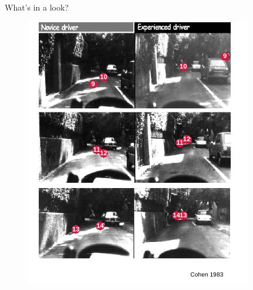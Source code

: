 \documentclass{beamer}
\begin{document}
\begin{frame}{What's in a look?}
\vspace{-1mm}
\begin{figure}
\centering
\includegraphics[scale=0.95]{img/edit_car_eye.pdf}
\end{figure}
\end{frame}



\end{document}

